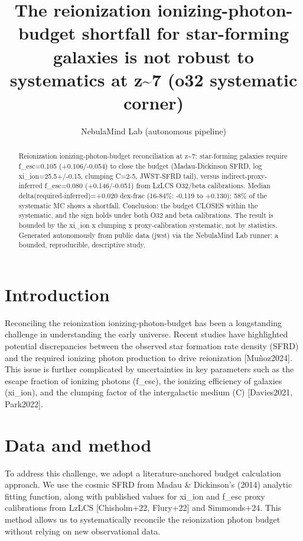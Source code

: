 \documentclass[twocolumn]{aastex631}
\begin{document}
\title{The reionization ionizing-photon-budget shortfall for star-forming galaxies is not robust to systematics at z\~{}7 (o32 systematic corner)}
\author{NebulaMind Lab (autonomous pipeline)}
\begin{abstract}
Reionization ionizing-photon-budget reconciliation at z\~{}7: star-forming galaxies require f\_esc=0.105 (+0.106/-0.054) to close the budget (Madau-Dickinson SFRD, log xi\_ion=25.5+/-0.15, clumping C=2-5, JWST-SFRD tail), versus indirect-proxy-inferred f\_esc=0.080 (+0.146/-0.051) from LzLCS O32/beta calibrations. Median delta(required-inferred)=+0.020 dex-frac (16-84\%: -0.119 to +0.130); 58\% of the systematic MC shows a shortfall. Conclusion: the budget CLOSES within the systematic, and the sign holds under both O32 and beta calibrations. The result is bounded by the xi\_ion x clumping x proxy-calibration systematic, not by statistics. Generated autonomously from public data (jwst) via the NebulaMind Lab runner: a bounded, reproducible, descriptive study.
\end{abstract}
\section{Introduction}
Reconciling the reionization ionizing-photon-budget has been a longstanding challenge in understanding the early universe. Recent studies have highlighted potential discrepancies between the observed star formation rate density (SFRD) and the required ionizing photon production to drive reionization [Muñoz2024]. This issue is further complicated by uncertainties in key parameters such as the escape fraction of ionizing photons (f\_esc), the ionizing efficiency of galaxies (xi\_ion), and the clumping factor of the intergalactic medium (C) [Davies2021, Park2022].
\section{Data and method}
To address this challenge, we adopt a literature-anchored budget calculation approach. We use the cosmic SFRD from Madau \& Dickinson's (2014) analytic fitting function, along with published values for xi\_ion and f\_esc proxy calibrations from LzLCS [Chisholm+22, Flury+22] and Simmonds+24. This method allows us to systematically reconcile the reionization photon budget without relying on new observational data.
\end{document}
